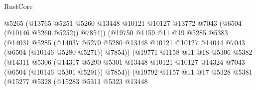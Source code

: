 \begin{lexlean}{RustCore}
\begin{coremodule}
                                  @5265
                                  (@13765
                                    @5251
                                    @5260
                                    @13448
                                    @10121
                                    @10127
                                    @13772
                                    @7043
                                    (@6504 (@10146 @5260 @5252))
                                    @7854))
                                (@19750
                                  @1159
                                  @11
                                  @19
                                  @5285
                                  @5383
                                  (@14031
                                    @5285
                                    (@14037
                                      @5270
                                      @5280
                                      @13448
                                      @10121
                                      @10127
                                      @14044
                                      @7043
                                      (@6504 (@10146 @5280 @5271))
                                      @7854))
                                  (@19771
                                    @1158
                                    @11
                                    @18
                                    @5306
                                    @5382
                                    (@14311
                                      @5306
                                      (@14317
                                        @5290
                                        @5301
                                        @13448
                                        @10121
                                        @10127
                                        @14324
                                        @7043
                                        (@6504 (@10146 @5301 @5291))
                                        @7854))
                                    (@19792
                                      @1157
                                      @11
                                      @17
                                      @5328
                                      @5381
                                      (@15277
                                        @5328
                                        (@15283
                                          @5311
                                          @5323
                                          @13448

\end{coremodule}
\end{lexlean}
